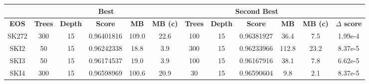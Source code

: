 \begin{table}[]
\centering
\begin{tabular}{@{}|c|ccccc|ccccc|c|@{}}
\toprule
\multicolumn{1}{|l|}{} & \multicolumn{5}{c|}{Best}                                                                                                                                            & \multicolumn{5}{c|}{Second Best}                                                                                                                                     &                 \\ \midrule
\textbf{EOS}           & \multicolumn{1}{c|}{\textbf{Trees}} &
    \multicolumn{1}{c|}{\textbf{Depth}} & \multicolumn{1}{c|}{\textbf{Score}} &
    \multicolumn{1}{c|}{\textbf{MB}} & \textbf{MB (c)} &
    \multicolumn{1}{c|}{\textbf{Trees}} & \multicolumn{1}{c|}{\textbf{Depth}} &
    \multicolumn{1}{c|}{\textbf{Score}} & \multicolumn{1}{c|}{\textbf{MB}} &
    \textbf{MB (c)} & \textbf{$\Delta$ score} \\ \midrule
SK272                  & \multicolumn{1}{c|}{300}            & \multicolumn{1}{c|}{15}             & \multicolumn{1}{c|}{0.96401816}     & \multicolumn{1}{c|}{109.0}       & 22.6            & \multicolumn{1}{c|}{100}            & \multicolumn{1}{c|}{15}             & \multicolumn{1}{c|}{0.96381927}     & \multicolumn{1}{c|}{36.4}        & 7.5             & 1.99e-4         \\ \midrule
SKI2                   & \multicolumn{1}{c|}{50}             & \multicolumn{1}{c|}{15}             & \multicolumn{1}{c|}{0.96242338}     & \multicolumn{1}{c|}{18.8}        & 3.9             & \multicolumn{1}{c|}{300}            & \multicolumn{1}{c|}{15}             & \multicolumn{1}{c|}{0.96233966}     & \multicolumn{1}{c|}{112.8}       & 23.2            & 8.37e-5         \\ \midrule
SKI3                   & \multicolumn{1}{c|}{50}             & \multicolumn{1}{c|}{15}             & \multicolumn{1}{c|}{0.96174537}     & \multicolumn{1}{c|}{19.0}        & 3.9             & \multicolumn{1}{c|}{100}            & \multicolumn{1}{c|}{15}             & \multicolumn{1}{c|}{0.96167916}     & \multicolumn{1}{c|}{38.1}        & 7.8             & 6.62e-5         \\ \midrule
SKI4                   & \multicolumn{1}{c|}{300}            & \multicolumn{1}{c|}{15}             & \multicolumn{1}{c|}{0.96598969}     & \multicolumn{1}{c|}{100.6}       & 20.9            & \multicolumn{1}{c|}{30}             & \multicolumn{1}{c|}{15}             & \multicolumn{1}{c|}{0.96590604}     & \multicolumn{1}{c|}{9.8}         & 2.1             & 8.37e-5         \\ \midrule

\end{tabular}
\end{table}
